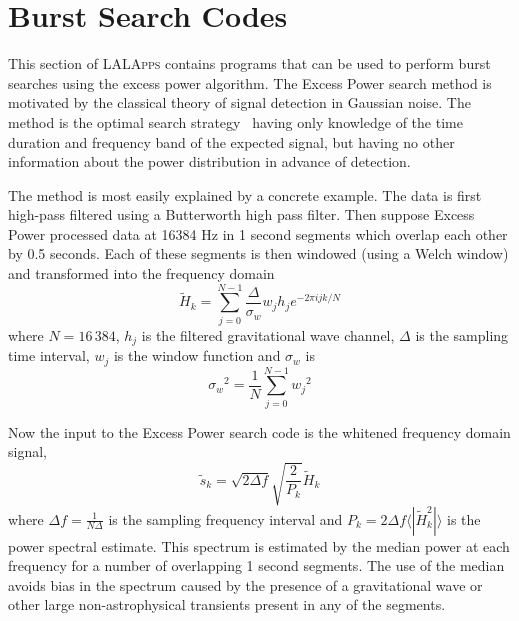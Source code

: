 
\chapter{Burst Search Codes}
\label{chapter:powertools}

This section of \textsc{LALApps} contains programs that can be used to
perform burst searches using the excess power algorithm.   
The Excess Power search method is motivated by the classical theory of
signal detection in Gaussian noise.  The method is the optimal search
strategy~\cite{Anderson:2000yy} having only knowledge of the time duration
and frequency band of the expected signal,  but having no other
information about the power distribution in advance of detection. 

The method is most easily explained by a concrete example.
The data is first high-pass filtered using a Butterworth high pass filter.
Then suppose Excess Power processed data at 16384 Hz in 1 second segments 
which overlap each other by 0.5 seconds. Each of these segments is then 
windowed (using a Welch window) and transformed into the frequency domain 
\begin{equation}
\tilde{H}_k =  \sum_{j=0}^{N-1}\frac{\Delta}{\sigma_w}w_jh_j e^{-2 \pi i j k /N}
\end{equation}
where $N=16\, 384$, $h_j$ is the filtered gravitational 
wave channel, $\Delta$ is the sampling time interval, $w_j$ is the window
function and $\sigma_w$ is  
\begin{equation}
{\sigma_w}^2 = \frac{1}{N}\sum_{j=0}^{N-1}{w_j}^2
\end{equation}

Now the input to the Excess Power search code is the whitened 
frequency domain signal,
\begin{equation}
\tilde{s}_k = \sqrt{2\Delta f}\sqrt{\frac{2}{P_k}}\tilde{H}_k
\end{equation}
where $\Delta f = \frac{1}{N\Delta}$ is the sampling frequency interval and 
$P_k = 2 \Delta f\langle|\tilde{H}_k^2| \rangle$ is the 
power spectral estimate.  This spectrum is estimated by the median
power at each frequency for a number of overlapping 1 second segments.
The use of the median avoids bias in the spectrum caused by the
presence of a gravitational wave or other large non-astrophysical
transients present in any of the segments.   

